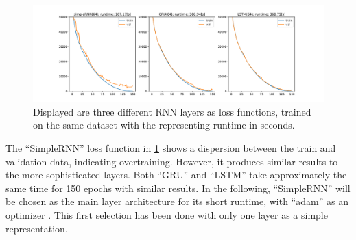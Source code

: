 \begin{figure}
    \centering
    \includegraphics[width = 1\textwidth]{images/compare_models.pdf}
    \caption{Displayed are three different RNN layers as loss functions, trained on the same dataset with the representing runtime in seconds.}
    \label{fig:compare}
\end{figure}
\noindent
The \enquote{SimpleRNN} loss function in \ref{fig:compare} shows a dispersion between the train and validation data, indicating overtraining. However, it produces similar results to the more sophisticated layers.
Both \enquote{GRU} and \enquote{LSTM} take approximately the same time for 150 epochs with similar results. In the following, \enquote{SimpleRNN} will be chosen as the main layer architecture for its short runtime, with \enquote{adam} as an optimizer \cite{keras}.
This first selection has been done with only one layer as a simple representation.

